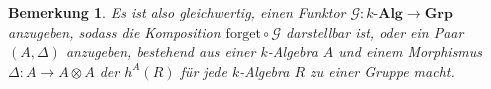 \documentclass[a4paper, 11pt]{scrartcl}
\newcommand{\Hom}{\text{Hom}}
\newcommand{\CC}{\mathcal{C}}
\theoremstyle{basicstyle}
\newtheorem{definition}{Definition}[section]
\newtheorem{bemerkung}[definition]{Bemerkung}
\begin{document}
    \begin{bemerkung}
        Es ist also gleichwertig, einen Funktor \(\mathcal{G}: k\textbf{-Alg} \to \textbf{Grp}\) anzugeben, sodass die Komposition \(\text{forget} \circ \mathcal{G}\) darstellbar ist, oder ein Paar \((A, \Delta)\) anzugeben, bestehend aus einer \(k\)-Algebra \(A\) und einem Morphismus \(\Delta: A \to A \otimes A\) der \(h^A(R)\) für jede \(k\)-Algebra \(R\) zu einer Gruppe macht.
    \end{bemerkung}



\end{document}
